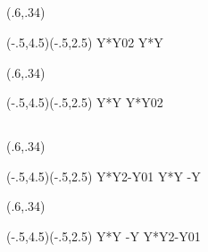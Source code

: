 \documentclass[a4j]{jarticle}
\begin{document}
\subsection{}
\begin{showEx}(.6,.34){}
\begin{pszahyou}[ul=8mm](-.5,4.5)(-.5,2.5)
  \def\Fy{Y*Y}
  \XNuri\Fy{0}{2}
  \XGurafu*[sitay=0]\Fy
  \Drawline{\O\A}
  \Put\A[syaei=xy]{}
\end{pszahyou}
\end{showEx}

\begin{showEx}(.6,.34){}
\begin{pszahyou}[ul=8mm](-.5,4.5)(-.5,2.5)
  \def\Fy{Y*Y}
  \XGurafu*[sitay=0]\Fy
  \Drawline{\O\A}
  \XNuri*[-45]\Fy{0}{2}
  \Put\A[syaei=xy]{}
\end{pszahyou}
\end{showEx}

\subsection{}
\begin{showEx}(.6,.34){}
\begin{pszahyou}[ul=8mm](-.5,4.5)(-.5,2.5)
  \def\Fy{Y*Y}
  \def\Gy{2-Y}
  \XNurii\Fy\Gy{0}{1}
  \XGurafu*[sitay=0]\Fy
  \XGurafu*\Gy
  \Put\A[syaei=xy]{}
\end{pszahyou}
\end{showEx}

\begin{showEx}(.6,.34){}
\begin{pszahyou}[ul=8mm](-.5,4.5)(-.5,2.5)
  \def\Fy{Y*Y}
  \def\Gy{2-Y}
  \XGurafu*[sitay=0]\Fy
  \XGurafu*\Gy
  \XNurii*[60]\Fy\Gy{0}{1}
  \Put\A[syaei=xy]{}
\end{pszahyou}
\end{showEx}

\end{document}
